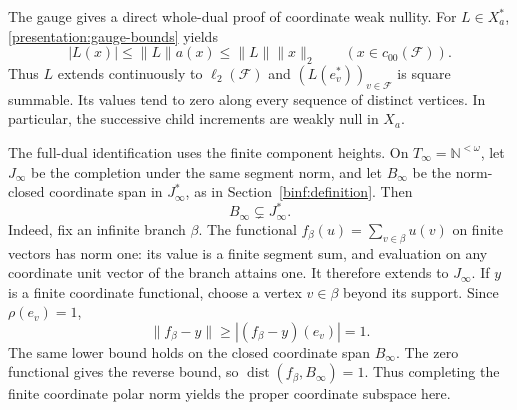 \begin{remark}\label{presentation:weak-null-coordinates}
The gauge gives a direct whole-dual proof of coordinate weak nullity.
For $L\in X_a^*$, \eqref{presentation:gauge-bounds} yields
\[
 |L(x)|\le\|L\|a(x)\le\|L\|\|x\|_2
 \qquad(x\in c_{00}(\mathcal F)).
\]
Thus $L$ extends continuously to $\ell_2(\mathcal F)$ and
$(L(e_v^*))_{v\in\mathcal F}$ is square summable. Its values tend to
zero along every sequence of distinct vertices. In particular, the
successive child increments are weakly null in $X_a$.
\end{remark}

\begin{remark}\label{presentation:infinite-height}
The full-dual identification uses the finite component heights. On
$T_\infty=\mathbb N^{<\omega}$, let $J_\infty$ be the completion
under the same segment norm, and let $B_\infty$ be the norm-closed
coordinate span in $J_\infty^*$, as in Section~\ref{binf:definition}.
Then
\[
 B_\infty\subsetneq J_\infty^*.
\]
Indeed, fix an infinite branch $\beta$. The functional
$f_\beta(u)=\sum_{v\in\beta}u(v)$ on finite vectors has norm one:
its value is a finite segment sum, and evaluation on any coordinate
unit vector of the branch attains one. It therefore extends to
$J_\infty$. If $y$ is a finite coordinate functional, choose a vertex
$v\in\beta$ beyond its support. Since $\rho(e_v)=1$,
\[
 \|f_\beta-y\|\ge|(f_\beta-y)(e_v)|=1.
\]
The same lower bound holds on the closed coordinate span $B_\infty$.
The zero functional gives the reverse bound, so
$\operatorname{dist}(f_\beta,B_\infty)=1$. Thus completing the finite
coordinate polar norm yields the proper coordinate subspace here.
\end{remark}
